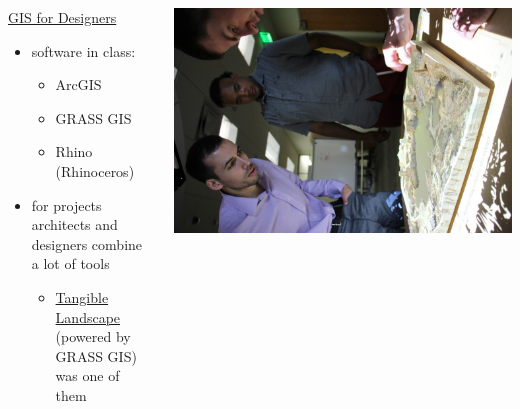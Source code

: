 \documentclass[xcolor={dvipsnames,usenames},beamer,aspectratio=169]{beamer}
\begin{document}
\begin{frame}{\coursesTitle}


\begin{columns}[c]


\begin{block}{\href{http://courses.ncsu.edu/lar582/common/}%
  {GIS for Designers}}
\begin{itemize}
 \item software in class:
 \begin{itemize}
  \item ArcGIS
  \item GRASS GIS
  \item Rhino (Rhinoceros)
 \end{itemize}
 \item for projects architects and designers combine a lot of tools
 \begin{itemize}
  \item \href{http://geospatial.ncsu.edu/osgeorel/tangible-landscape.html}{Tangible Landscape}
    (powered by GRASS GIS) was one of them
 \end{itemize}

\end{itemize}

\end{block}


\href{https://www.lib.ncsu.edu/stories/re-imagining-lake-raleigh-woods}{%
\includegraphics[width=\textwidth]{./images/edu/designers}%
}

\end{columns}

\end{frame}
\end{document}
